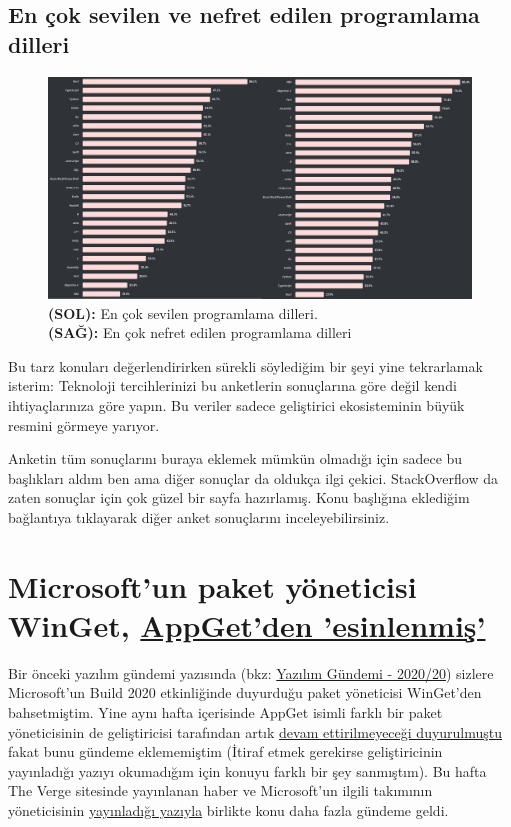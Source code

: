 \documentclass[11pt]{article}
\begin{document}
\subsection{En çok sevilen ve nefret edilen programlama dilleri}
\label{sec:org1cb4d52}
\begin{figure}[htbp]
\centering
\includegraphics[width=.9\linewidth]{gorseller/stackoverflow-sev-nefret.png}
\caption[\textbf{(SAĞ):}]{\textbf{(SOL):} En çok sevilen programlama dilleri. \\
 \textbf{(SAĞ):} En çok nefret edilen programlama dilleri}
\end{figure}

Bu tarz konuları değerlendirirken sürekli söylediğim bir şeyi yine tekrarlamak
isterim: Teknoloji tercihlerinizi bu anketlerin sonuçlarına göre değil kendi
ihtiyaçlarınıza göre yapın. Bu veriler sadece geliştirici ekosisteminin büyük
resmini görmeye yarıyor.

Anketin tüm sonuçlarını buraya eklemek mümkün olmadığı için sadece bu
başlıkları aldım ben ama diğer sonuçlar da oldukça ilgi çekici. StackOverflow
da zaten sonuçlar için çok güzel bir sayfa hazırlamış. Konu başlığına
eklediğim bağlantıya tıklayarak diğer anket sonuçlarını inceleyebilirsiniz.
\section{Microsoft'un paket yöneticisi WinGet, \href{https://www.theverge.com/2020/5/28/21272964/microsoft-winget-windows-package-manager-appget-copied}{AppGet'den 'esinlenmiş'}}
\label{sec:org363efbe}
Bir önceki yazılım gündemi yazısında (bkz: \href{../20/yazilim-gundemi-2020-20.pdf}{Yazılım Gündemi - 2020/20}) sizlere
Microsoft'un Build 2020 etkinliğinde duyurduğu paket yöneticisi WinGet'den
bahsetmiştim. Yine aynı hafta içerisinde AppGet isimli farklı bir paket
yöneticisinin de geliştiricisi tarafından artık \href{https://keivan.io/the-day-appget-died/}{devam ettirilmeyeceği
duyurulmuştu} fakat bunu gündeme eklememiştim (İtiraf etmek gerekirse
geliştiricinin yayınladığı yazıyı okumadığım için konuyu farklı bir şey
sanmıştım). Bu hafta The Verge sitesinde yayınlanan haber ve Microsoft'un
ilgili takımının yöneticisinin \href{https://devblogs.microsoft.com/commandline/winget-install-learning/}{yayınladığı yazıyla} birlikte konu daha fazla
gündeme geldi.
\end{document}
